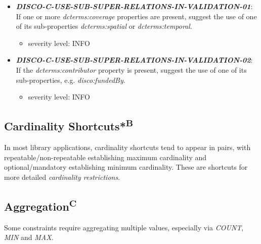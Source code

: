\documentclass{llncs}
\begin{document}
\begin{itemize}
	\item \textbf{{\em DISCO-C-USE-SUB-SUPER-RELATIONS-IN-VALIDATION-01}}: 
	If one or more \emph{dcterms:coverage} properties are present, suggest the use of one of its sub-properties \emph{dcterms:spatial} or \emph{dcterms:temporal}.
		\begin{itemize}
		\item severity level: INFO
	\end{itemize}
	\item \textbf{{\em DISCO-C-USE-SUB-SUPER-RELATIONS-IN-VALIDATION-02}}: 
	If the \emph{dcterms:contributor} property is present, suggest the use of one of its sub-properties, e.g. \emph{disco:fundedBy}.
		\begin{itemize}
		\item severity level: INFO
	\end{itemize}
\end{itemize}

\subsection{Cardinality Shortcuts*\textsuperscript{B}}

In most library applications, cardinality shortcuts tend to appear in pairs, with repeatable/non-repeatable establishing maximum cardinality and optional/mandatory establishing minimum cardinality.
These are shortcuts for more detailed \emph{cardinality restrictions}.

\subsection{Aggregation\textsuperscript{C}}

Some constraints require aggregating multiple values, especially via \emph{COUNT}, \emph{MIN} and \emph{MAX}.
\end{document}
